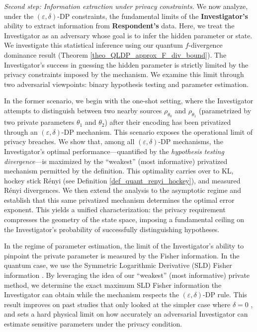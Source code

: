 \documentclass[onecolumn,ldraftcls, 11pt]{IEEEtran}
\newcommand{\eps}{\varepsilon}
\begin{document}
{\em Second step: Information extraction under privacy constraints.}
We now analyze, under the $(\eps,\delta)$-DP constraints, the fundamental limits of the \textbf{Investigator's} ability to extract information from \textbf{Respondent's} data. Here, we treat the Investigator as an adversary whose goal is to infer the hidden parameter or state. We investigate this statistical inference using our quantum $f$-divergence dominance result (Theorem \ref{theo_QLDP_approx_F_div_bound}). The Investigator's success in guessing the hidden parameter is strictly limited by the privacy constraints imposed by the mechanism. We examine this limit through two adversarial viewpoints: binary hypothesis testing and parameter estimation.

In the former scenario, we begin with the one-shot setting, where the Investigator attempts to distinguish between two nearby sources $\rho_{\theta_0}$ and $\rho_{\theta_1}$ (parametrized by two private parameters $\theta_1$ and $\theta_2$) after their encoding has been privatized through an $(\eps,\delta)$-DP mechanism. This scenario exposes the operational limit of privacy breaches. We show that, among all $(\eps,\delta)$-DP mechanisms, the Investigator's optimal performance—quantified by the \emph{hypothesis testing divergence}—is maximized by the ``weakest'' (most informative) privatized mechanism permitted by the definition. This optimality carries over to KL, hockey stick R\'enyi (see Definition \ref{def_quant_renyi_hockey}), and measured R\'enyi divergences. We then extend the analysis to the asymptotic regime and establish that this same privatized mechanism determines the optimal error exponent. This yields a unified characterization: the privacy requirement compresses the geometry of the state space, imposing a fundamental ceiling on the Investigator's probability of successfully distinguishing hypotheses.

In the regime of parameter estimation, the limit of the Investigator’s ability to pinpoint the private parameter is measured by the Fisher information. In the quantum case, we use the Symmetric Logarithmic Derivative (SLD) Fisher information \cite{Hiai1991}. By leveraging the idea of our ``weakest'' (most informative) private method, we determine the exact maximum SLD Fisher information the Investigator can obtain while the mechanism respects the $(\eps, \delta)$-DP rule. This result improves on past studies that only looked at the simpler case where $\delta=0$ \cite{YH20}, and sets a hard physical limit on how accurately an adversarial Investigator can estimate sensitive parameters under the privacy condition.
\end{document}
